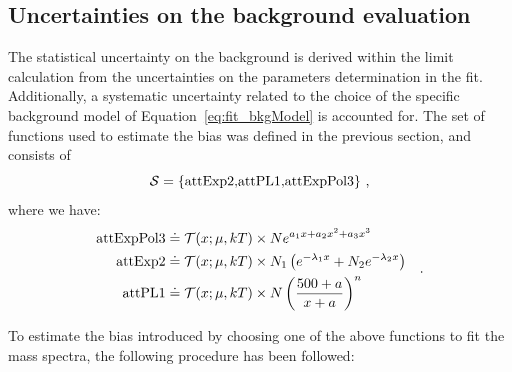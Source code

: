 \subsection{Uncertainties on the background evaluation}

The statistical uncertainty on the background is derived within the limit calculation from the
uncertainties on the parameters determination in the fit. Additionally, a systematic uncertainty
related to the choice of the specific background model of Equation~\ref{eq:fit_bkgModel} is
accounted for. The set of functions used to estimate the bias was defined in the previous section,
and consists of
$$
\mathcal{S} = \{\textnormal{attExp2,attPL1,attExpPol3}\}~,
$$
where we have:
\begin{equation}
\begin{split}
\textnormal{attExpPol3} & \doteq \mathcal{T}(x;\mu,kT) \times N e^{a_1 x + a_2 x^2 + a_3 x^3} \\
\textnormal{attExp2}    & \doteq \mathcal{T}(x;\mu,kT) \times N_1 \left( e^{-\lambda_1 x} + N_2 e^{-\lambda_2 x} \right) \\
\textnormal{attPL1}     & \doteq \mathcal{T}(x;\mu,kT) \times N \left(\frac{500+a}{x+a}\right)^n
\end{split}
\quad{.}
\end{equation}

To estimate the bias introduced by choosing one of the above functions to fit the mass spectra, the
following procedure has been followed:

